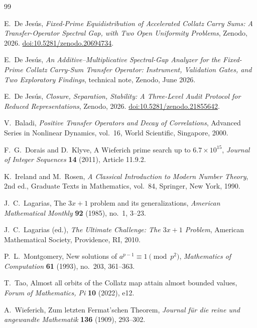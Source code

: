 \documentclass[11pt]{article}
\providecommand{\doi}[1]{\href{https://doi.org/#1}{doi:#1}}
\theoremstyle{definition}
\theoremstyle{remark}
\begin{document}
\begin{thebibliography}{99}

E.~De Jes\'us,
\emph{Fixed-Prime Equidistribution of Accelerated Collatz Carry Sums: A Transfer-Operator Spectral Gap, with Two Open Uniformity Problems},
Zenodo, 2026.
\doi{10.5281/zenodo.20694734}.

E.~De Jes\'us,
\emph{An Additive--Multiplicative Spectral-Gap Analyzer for the Fixed-Prime Collatz Carry-Sum Transfer Operator: Instrument, Validation Gates, and Two Exploratory Findings},
technical note, Zenodo, June 2026.

E.~De Jes\'us,
\emph{Closure, Separation, Stability: A Three-Level Audit Protocol for Reduced Representations},
Zenodo, 2026.
\doi{10.5281/zenodo.21855642}.

V.~Baladi,
\emph{Positive Transfer Operators and Decay of Correlations},
Advanced Series in Nonlinear Dynamics, vol.~16, World Scientific, Singapore, 2000.

F.~G.~Dorais and D.~Klyve,
A Wieferich prime search up to $6.7\times10^{15}$,
\emph{Journal of Integer Sequences} \textbf{14} (2011), Article 11.9.2.

K.~Ireland and M.~Rosen,
\emph{A Classical Introduction to Modern Number Theory}, 2nd ed.,
Graduate Texts in Mathematics, vol.~84, Springer, New York, 1990.

J.~C.~Lagarias,
The $3x+1$ problem and its generalizations,
\emph{American Mathematical Monthly} \textbf{92} (1985), no.~1, 3--23.

J.~C.~Lagarias (ed.),
\emph{The Ultimate Challenge: The $3x+1$ Problem},
American Mathematical Society, Providence, RI, 2010.

P.~L.~Montgomery,
New solutions of $a^{p-1}\equiv1\pmod{p^2}$,
\emph{Mathematics of Computation} \textbf{61} (1993), no.~203, 361--363.

T.~Tao,
Almost all orbits of the Collatz map attain almost bounded values,
\emph{Forum of Mathematics, Pi} \textbf{10} (2022), e12.

A.~Wieferich,
Zum letzten Fermat'schen Theorem,
\emph{Journal f\"ur die reine und angewandte Mathematik} \textbf{136} (1909), 293--302.

\end{thebibliography}
\end{document}
